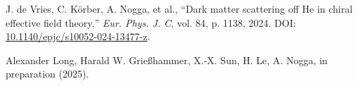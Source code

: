 \documentclass[a4paper,11pt]{article}
\begin{document}
\begin{thebibliography}{99}
J. de Vries, C. Körber, A. Nogga, et al., ``Dark matter scattering
off He in chiral effective field theory,'' \textit{Eur. Phys. J.
C}, vol. 84, p. 1138, 2024. DOI:
\href{https://doi.org/10.1140/epjc/s10052-024-13477-z}{10.1140/epjc/s10052-024-13477-z}.

Alexander Long, Harald W. Grie{\ss}hammer, X.-X. Sun, H. Le, A. Nogga,  in preparation (2025).
\end{thebibliography}
\end{document}
